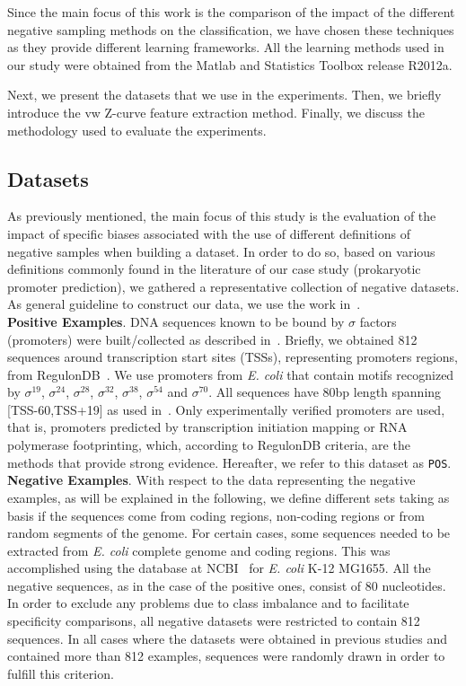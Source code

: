 \documentclass[conference]{IEEEtran}
\begin{document}
Since the main focus of this work is the comparison of the impact of the different negative sampling methods on the classification, we have chosen these techniques as they provide different learning frameworks. All the learning methods used in our study were obtained from the Matlab and Statistics Toolbox release R2012a.

Next, we present the datasets that we use in the experiments. Then, we briefly introduce the vw Z-curve feature extraction method. Finally, we discuss the methodology used to evaluate the experiments.

\subsection{Datasets}

As previously mentioned, the main focus of this study is the evaluation of the impact of specific biases associated with the use of different definitions of negative samples when building a dataset. In order to do so, based on various definitions commonly found in the literature of our case study  (prokaryotic promoter prediction), we gathered a representative collection of negative datasets. As general guideline to construct our data, we use the work in~\cite{gordon2003,song2011a}. \\

\noindent
{\bf Positive Examples}.  DNA sequences known to be bound by $\sigma$ factors (promoters) were built/collected  as described in~\cite{gordon2003,song2011a}. Briefly, we obtained 812 sequences around transcription start sites (TSSs), representing promoters regions, from RegulonDB~\cite{gama2011}. We use promoters from {\it E. coli} that contain motifs recognized by ${\sigma }^{{19}}$, ${\sigma }^{{24}}$, ${\sigma }^{{28}}$, ${\sigma }^{{32}}$, ${\sigma }^{{38}}$, ${\sigma }^{{54}}$ and ${\sigma }^{{70}}$. All sequences have 80bp length spanning [TSS-60,TSS+19] as used in~\cite{song2011a}. Only experimentally verified promoters are used, that is, promoters predicted by transcription initiation mapping or RNA polymerase footprinting, which, according to RegulonDB criteria, are the methods that provide strong evidence. Hereafter, we refer to this dataset as {\tt POS}.\\

\noindent
{\bf Negative Examples}. With respect to the data representing the negative examples, as will be explained in the following, we define different sets taking as basis if the sequences come from coding regions, non-coding regions or from random segments of the genome. For certain cases, some sequences needed to be extracted from {\it E. coli } complete genome and coding regions. This was accomplished using the database at NCBI~\cite{ncbi2012} for {\it E. coli } K-12 MG1655. All the negative sequences, as in the case of the positive ones, consist of 80 nucleotides. In order to exclude any problems due to class imbalance and to facilitate specificity comparisons, all negative datasets were restricted to contain 812 sequences. In all cases where the datasets were obtained in previous studies and contained more than 812 examples, sequences were randomly drawn in order to fulfill this criterion.
\end{document}

